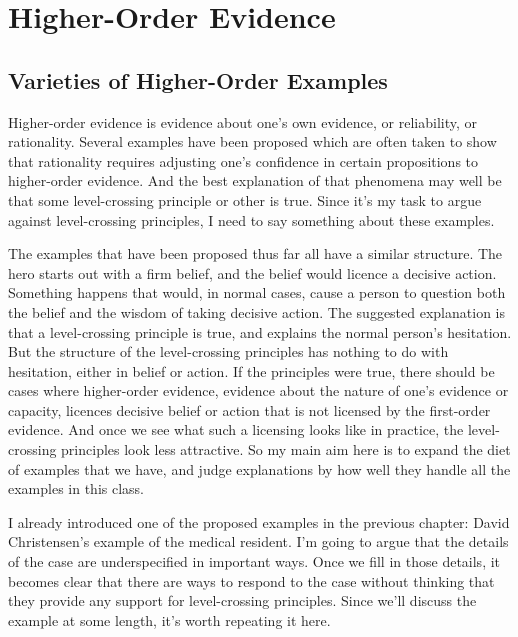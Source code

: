 \documentclass[
  10pt,
  letterpaper,
  twoside]{scrbook}
\begin{document}
\chapter{Higher-Order Evidence}\label{higher-order-evidence}

\section{Varieties of Higher-Order
Examples}\label{varietiesofhigher-orderexamples}

Higher-order evidence is evidence about one's own evidence, or
reliability, or rationality. Several examples have been proposed which
are often taken to show that rationality requires adjusting one's
confidence in certain propositions to higher-order evidence. And the
best explanation of that phenomena may well be that some level-crossing
principle or other is true. Since it's my task to argue against
level-crossing principles, I need to say something about these examples.

The examples that have been proposed thus far all have a similar
structure. The hero starts out with a firm belief, and the belief would
licence a decisive action. Something happens that would, in normal
cases, cause a person to question both the belief and the wisdom of
taking decisive action. The suggested explanation is that a
level-crossing principle is true, and explains the normal person's
hesitation. But the structure of the level-crossing principles has
nothing to do with hesitation, either in belief or action. If the
principles were true, there should be cases where higher-order evidence,
evidence about the nature of one's evidence or capacity, licences
decisive belief or action that is not licensed by the first-order
evidence. And once we see what such a licensing looks like in practice,
the level-crossing principles look less attractive. So my main aim here
is to expand the diet of examples that we have, and judge explanations
by how well they handle all the examples in this class.

I already introduced one of the proposed examples in the previous
chapter: David Christensen's example of the medical resident. I'm going
to argue that the details of the case are underspecified in important
ways. Once we fill in those details, it becomes clear that there are
ways to respond to the case without thinking that they provide any
support for level-crossing principles. Since we'll discuss the example
at some length, it's worth repeating it here.
\end{document}
